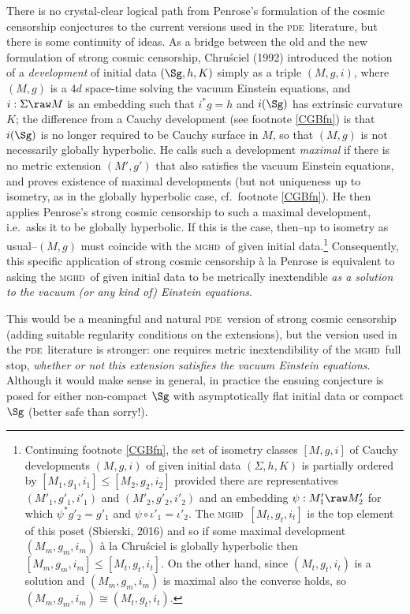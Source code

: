 \documentclass[11pt,a4paper]{article}
\newcommand{\mghd}{\textsc{mghd}}
\newcommand{\pde}{\textsc{pde}}
\begin{document}
There is no  crystal-clear logical path from Penrose's formulation of the  cosmic censorship conjectures to the current versions used in the \pde\ literature, but there is some continuity of ideas. As a bridge between the old and the new formulation of strong cosmic censorship, Chru\'{s}ciel (1992) introduced the notion of a 
 \emph{development} of initial data $(\Sg,h,K)$ simply as a triple $(M,g,i)$, where $(M,g)$ is a $4d$ space-time solving the vacuum Einstein equations, and $i:\Sigma\raw M$ is an embedding such that $i^*g=h$ and $i(\Sg)$ has extrinsic curvature  $K$;
 the difference from a Cauchy development (see  footnote \ref{CGBfn}) is that 
 $i(\Sg)$ is no longer required to be Cauchy surface in $M$, so that $(M,g)$ is not necessarily globally hyperbolic.
 He calls such a development \emph{maximal} if there is no metric extension $(M',g')$ that also satisfies the vacuum
Einstein equations, and proves existence of maximal developments (but not uniqueness up to isometry, as in  the globally hyperbolic case, cf.\ footnote \ref{CGBfn}). He then applies Penrose's strong cosmic censorship to such a maximal development, i.e.\ asks it to be globally hyperbolic. If this is the case, then--up to isometry as usual--$(M,g)$  must coincide with the  \mghd\ of  given initial data.\footnote{Continuing footnote \ref{CGBfn}, the set of isometry classes $[M,g,i]$ of Cauchy developments $(M,g,i)$ of given initial data $(\Sigma, h,K)$ is partially ordered by $[M_1,g_1,i_1]\leq [M_2,g_2,i_2]$ provided there are representatives $(M'_1,g'_1,i'_1)$ and $(M'_2,g'_2,i'_2)$  and an embedding $\psi:M'_1\raw M'_2$ for which $\psi^*g'_2=g'_1$ and $\psi\circ\iota'_1=\iota'_2$. The \mghd\ $[M_t,g_t,i_t]$ is the top element of this poset (Sbierski, 2016) and so
if some maximal development  $(M_m,g_m,i_m)$ \`{a} la Chru\'{s}ciel is globally hyperbolic then 
$[M_m,g_m,i_m]\leq [M_t,g_t,i_t]$. On the other hand, since $(M_t,g_t,i_t)$ is a solution and $(M_m,g_m,i_m)$ is
maximal also the converse holds, so $(M_m,g_m,i_m)\cong  (M_t,g_t,i_t)$.}
 Consequently, this specific application of 
strong cosmic censorship \`{a} la Penrose is equivalent to
 asking  the \mghd\ of  given initial data to be metrically inextendible \emph{as a solution to the vacuum (or any kind of) Einstein equations}. 
 
 This would be a meaningful and natural \pde\ version of strong cosmic censorship (adding suitable regularity conditions on the  extensions),
 but the version used in the \pde\ literature is stronger: one requires metric inextendibility of the \mghd\ full stop, \emph{whether or not this extension satisfies the vacuum Einstein equations}. Although it would make sense in general, 
 in practice the ensuing conjecture is posed for either non-compact $\Sg$ with asymptotically flat initial data or compact $\Sg$ (better safe than sorry!).
 
\end{document}
